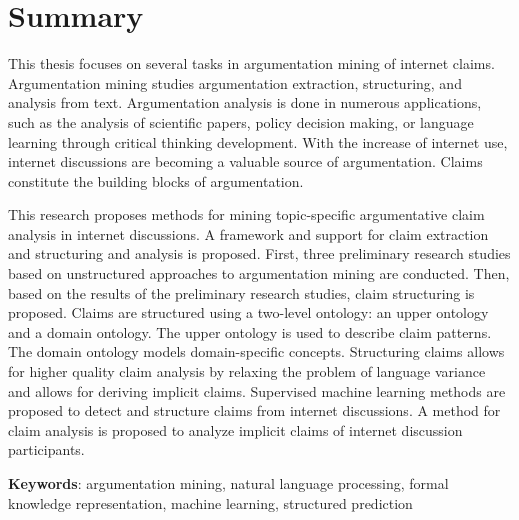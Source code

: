 \thispagestyle{empty}

\section*{Summary}

This thesis focuses on several tasks in argumentation mining
of internet claims. Argumentation mining studies argumentation
	extraction, structuring, and analysis from text. 
Argumentation analysis is done in numerous applications, such as
the analysis of scientific papers, policy decision making, or
language learning through critical thinking development. 
With the increase of internet use, 
internet discussions are becoming a valuable source of 
argumentation. Claims constitute the building blocks of
argumentation. 

This research proposes methods for mining topic-specific argumentative claim
analysis in internet discussions.  A framework and support for claim extraction
and structuring and analysis is proposed.  First, three preliminary research studies
based on unstructured approaches to argumentation mining are conducted.  Then,
based on the results of the preliminary research studies, claim structuring is
proposed.  Claims are structured using a two-level ontology: an upper
ontology and a domain ontology. The upper ontology is used to describe
claim patterns.  The domain ontology models domain-specific concepts.
Structuring claims allows for higher quality claim analysis by relaxing
the problem of language variance and allows for deriving implicit claims.
Supervised machine learning methods are proposed to detect and structure
claims from internet discussions.  A method for claim analysis is
proposed to analyze implicit claims of internet discussion participants. 

\vspace{1cm}
\textbf{Keywords}:  
argumentation mining, natural language processing, formal
knowledge representation, machine learning, structured prediction
